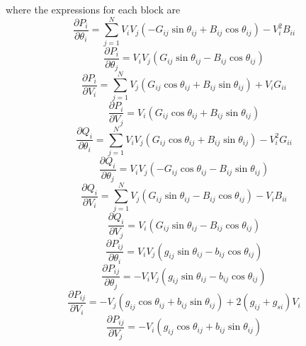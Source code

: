 \documentclass[12pt]{article}
\begin{document}
where the expressions for each block are
\begin{equation}
\frac{\partial P_{i}}{\partial \theta_i}  =\sum _{j=1}^N V_iV_j(-G_{ij}\sin\theta_{ij}+B_{ij}\cos{\theta_{ij}})-V_i^2B_{ii}
\end{equation}
\begin{equation}
\frac{\partial P_{i}}{\partial \theta_j}  =V_iV_j(G_{ij}\sin\theta_{ij}-B_{ij}\cos{\theta_{ij}})  
\end{equation}
\begin{equation}
\frac{\partial P_{i}}{\partial V_i}  =\sum _{j=1}^N V_j(G_{ij}\cos\theta_{ij}+B_{ij}\sin{\theta_{ij}})+V_iG_{ii} 
\end{equation}
\begin{equation}
\frac{\partial P_{i}}{\partial V_j}  =V_i(G_{ij}\cos\theta_{ij}+B_{ij}\sin{\theta_{ij}})
\end{equation}
\begin{equation}
\frac{\partial Q_{i}}{\partial \theta_i}  =\sum _{j=1}^N V_iV_j(G_{ij}\cos\theta_{ij}+B_{ij}\sin{\theta_{ij}})-V_i^2G_{ii}
\end{equation}
\begin{equation}
\frac{\partial Q_{i}}{\partial \theta_j}  =V_iV_j(-G_{ij}\cos\theta_{ij}-B_{ij}\sin{\theta_{ij}})  
\end{equation}
\begin{equation}
\frac{\partial Q_{i}}{\partial V_i}  =\sum _{j=1}^N V_j(G_{ij}\sin\theta_{ij}-B_{ij}\cos{\theta_{ij}})-V_iB_{ii} 
\end{equation}
\begin{equation}
\frac{\partial Q_{i}}{\partial V_j}  =V_i(G_{ij}\sin\theta_{ij}-B_{ij}\cos{\theta_{ij}}) 
\end{equation}
\begin{equation}
\frac{\partial P_{ij}}{\partial \theta_i}  =V_iV_j(g_{ij}\sin\theta_{ij}-b_{ij}\cos{\theta_{ij}})
\end{equation}
\begin{equation}
\frac{\partial P_{ij}}{\partial \theta_j}  =-V_iV_j(g_{ij}\sin\theta_{ij}-b_{ij}\cos{\theta_{ij}})
\end{equation}
\begin{equation}
\frac{\partial P_{ij}}{\partial V_i}  =-V_j(g_{ij}\cos\theta_{ij}+b_{ij}\sin{\theta_{ij}})+2(g_{ij}+g_{si})V_i
\end{equation}
\begin{equation}
\frac{\partial P_{ij}}{\partial V_j}  =-V_i(g_{ij}\cos\theta_{ij}+b_{ij}\sin{\theta_{ij}})
\end{equation}
\end{document}
